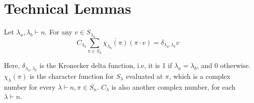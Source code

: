 \documentclass[11pt]{article}
\begin{document}
\section{Technical Lemmas}\label{app:techlemmas}
\begin{theorem}\label{thm:idempotent}
        Let $\lambda_a,\lambda_b\vdash n$.
        For any $v\in S_{\lambda_a}$
        \[C_{\lambda_b}\sum_{\pi\in S_n} \overline{\chi_{\lambda_b}(\pi)}( \pi\cdot v)=\delta_{\lambda_a,\lambda_b} v\]

        Here, $\delta_{\lambda_a,\lambda_b}$ is the Kronecker delta function, i.e, it is 1 if $\lambda_a=\lambda_b$, and $0$ otherwise. $\chi_{\lambda}(\pi)$ is the character function for $S_\lambda$ evaluated at $\pi$, which is a complex number for every $\lambda\vdash n, \pi\in S_n$. $C_{\lambda}$ is also another complex number, for each $\lambda\vdash n$.
        
    \end{theorem}
\annihilate*
\end{document}
